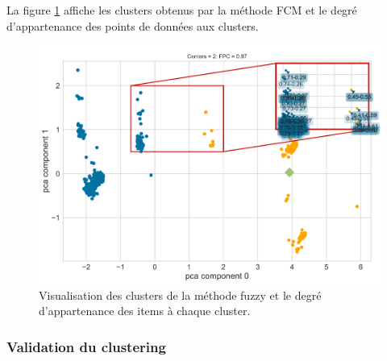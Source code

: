 \noindent La figure \ref{fuzzy_partition_plot} affiche les clusters obtenus par la méthode FCM et le degré d’appartenance des points de données aux clusters.

\begin{figure}[H]
	\begin{center}
		\includegraphics[width=\textwidth]{images/chapitre7/fuzzy_partition_plot.png}
	\end{center}
	\caption{Visualisation des clusters de la méthode fuzzy et le degré d’appartenance des items à chaque cluster.}
	\label{fuzzy_partition_plot}
\end{figure}


\subsubsection{Validation du clustering}


